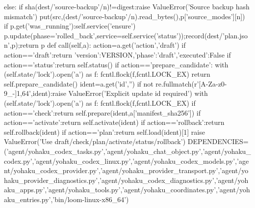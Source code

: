    else:
    if sha(dest/'source-backup'/n)!=digest:raise ValueError('Source backup hash mismatch')
    put(src,(dest/'source-backup'/n).read_bytes(),p['source_modes'][n])
  if p.get('was_running'):self.service('ensure')
  p.update(phase='rolled_back',service=self.service('status'));record(dest/'plan.json',p);return p
 def call(self,a):
  action=a.get('action','draft')
  if action=='draft':return {'version':VERSION,'phase':'draft','executed':False}
  if action=='status':return self.status()
  if action=='prepare_candidate':
   with (self.state/'lock').open('a') as f:
    fcntl.flock(f,fcntl.LOCK_EX)
    return self.prepare_candidate()
  ident=a.get('id','')
  if not re.fullmatch(r'[A-Za-z0-9_-]{1,64}',ident):raise ValueError('Explicit update id required')
  with (self.state/'lock').open('a') as f:
   fcntl.flock(f,fcntl.LOCK_EX)
   if action=='check':return self.prepare(ident,a['manifest_sha256'])
   if action=='activate':return self.activate(ident)
   if action=='rollback':return self.rollback(ident)
   if action=='plan':return self.load(ident)[1]
   raise ValueError('Use draft/check/plan/activate/status/rollback')
DEPENDENCIES=('agent/yohaku_codex_tasks.py','agent/yohaku_chat_object.py','agent/yohaku_codex.py','agent/yohaku_codex_linux.py','agent/yohaku_codex_models.py','agent/yohaku_codex_provider.py','agent/yohaku_provider_transport.py','agent/yohaku_provider_diagnostics.py','agent/yohaku_codex_diagnostics.py','agent/yohaku_apps.py','agent/yohaku_tools.py','agent/yohaku_coordinates.py','agent/yohaku_entries.py','bin/loom-linux-x86_64')

